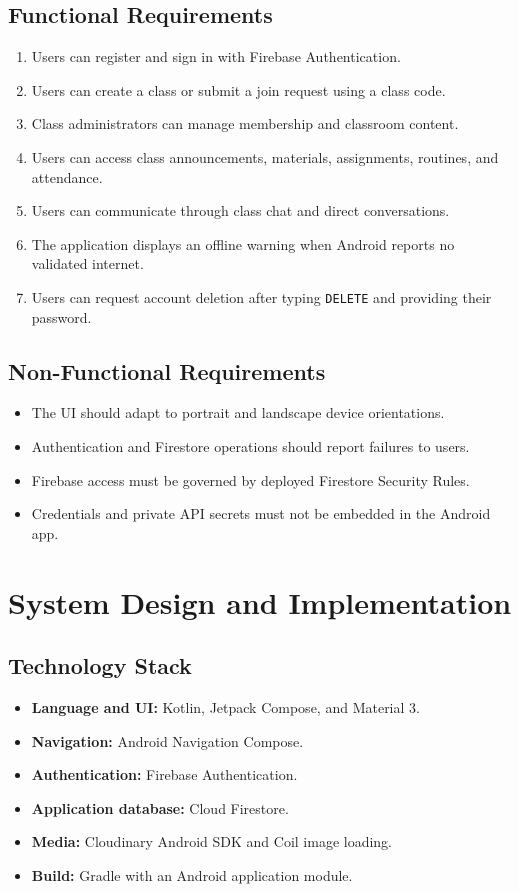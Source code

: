 \documentclass[12pt,a4paper]{report}
\begin{document}
\section{Functional Requirements}
\begin{enumerate}[leftmargin=*]
    \item Users can register and sign in with Firebase Authentication.
    \item Users can create a class or submit a join request using a class code.
    \item Class administrators can manage membership and classroom content.
    \item Users can access class announcements, materials, assignments, routines, and attendance.
    \item Users can communicate through class chat and direct conversations.
    \item The application displays an offline warning when Android reports no validated internet.
    \item Users can request account deletion after typing \texttt{DELETE} and providing their password.
\end{enumerate}

\section{Non-Functional Requirements}
\begin{itemize}[leftmargin=*]
    \item The UI should adapt to portrait and landscape device orientations.
    \item Authentication and Firestore operations should report failures to users.
    \item Firebase access must be governed by deployed Firestore Security Rules.
    \item Credentials and private API secrets must not be embedded in the Android app.
\end{itemize}

\chapter{System Design and Implementation}
\section{Technology Stack}
\begin{itemize}[leftmargin=*]
    \item \textbf{Language and UI:} Kotlin, Jetpack Compose, and Material 3.
    \item \textbf{Navigation:} Android Navigation Compose.
    \item \textbf{Authentication:} Firebase Authentication.
    \item \textbf{Application database:} Cloud Firestore.
    \item \textbf{Media:} Cloudinary Android SDK and Coil image loading.
    \item \textbf{Build:} Gradle with an Android application module.
\end{itemize}
\end{document}
